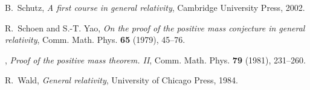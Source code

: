 \documentclass[12pt]{amsart}
\theoremstyle{definition}
\theoremstyle{remark}
\begin{document}
\begin{thebibliography}{MTW73}
B.~Schutz, \emph{A first course in general relativity}, Cambridge University
  Press, 2002.

R.~Schoen and S.-T. Yao, \emph{On the proof of the positive mass conjecture in general relativity}, Comm. Math.
  Phys. \textbf{65} (1979), 45--76.

\bysame, \emph{Proof of the positive mass theorem. II}, Comm. Math. Phys.
  \textbf{79} (1981), 231--260.

R.~Wald, \emph{General relativity}, University of Chicago Press, 1984.

\end{thebibliography}
\end{document}
